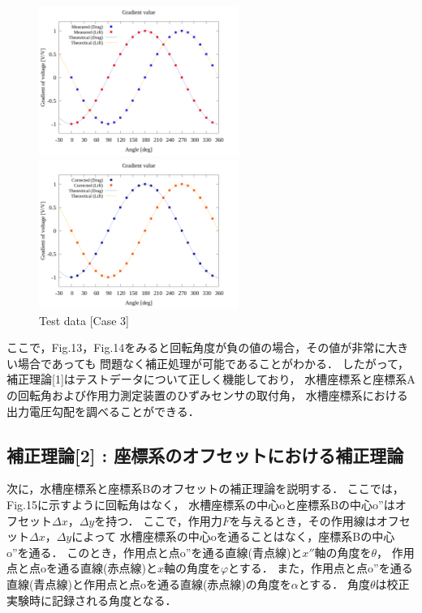 \begin{figure}[htbp]
  \begin{minipage}[b]{0.45\linewidth}
    \centering
    \includegraphics[width=65mm]{../../02_workspace/result/rotation_tx=90.0_ty=-90.0/plot/20/20_adjust-value.png}
  \end{minipage}
  \begin{minipage}[b]{0.45\linewidth}
    \centering
    \includegraphics[width=65mm]{../../02_workspace/result/rotation_tx=90.0_ty=-90.0/plot/21/21-4_summary.png}
  \end{minipage}
  \caption{Test data [Case 3]}
\end{figure}

ここで，Fig.13，Fig.14をみると回転角度が負の値の場合，その値が非常に大きい場合であっても
問題なく補正処理が可能であることがわかる．
したがって，補正理論[1]はテストデータについて正しく機能しており，
水槽座標系と座標系Aの回転角および作用力測定装置のひずみセンサの取付角，
水槽座標系における出力電圧勾配を調べることができる．

\newpage
\subsection{補正理論[2] : 座標系のオフセットにおける補正理論}

次に，水槽座標系と座標系Bのオフセットの補正理論を説明する．
ここでは，Fig.15に示すように回転角はなく，
水槽座標系の中心oと座標系Bの中心o''はオフセット$\Delta x$，$\Delta y$を持つ．
ここで，作用力$F$を与えるとき，その作用線はオフセット$\Delta x$，$\Delta y$によって
水槽座標系の中心oを通ることはなく，座標系Bの中心o''を通る．
このとき，作用点と点o''を通る直線(青点線)と$x''$軸の角度を$\theta$，
作用点と点oを通る直線(赤点線)と$x$軸の角度を$\varphi$とする．
また，作用点と点o''を通る直線(青点線)と作用点と点oを通る直線(赤点線)の角度を$\alpha$とする．
角度$\theta$は校正実験時に記録される角度となる．

